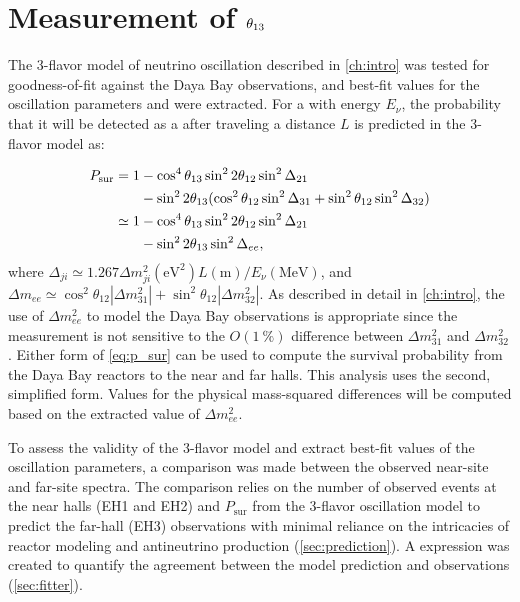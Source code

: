 \chapter{Measurement of \texorpdfstring{$\theta_{13}$}{theta13}}
\label{ch:analysis}

The 3-flavor model of neutrino oscillation described in \cref{ch:intro}
was tested for goodness-of-fit against the Daya Bay observations,
and best-fit values for the oscillation parameters \thetaot{} and \dmee{}
were extracted.
For a \nuebar{} with energy $E_\nu$,
the probability that it will be detected as a \nuebar{}
after traveling a distance $L$ is predicted in the 3-flavor model as:

\begin{align}\label{eq:p_sur}
    \begin{split}
        P_\text{sur} = 1 &- \cos^4\theta_{13}\sin^22\theta_{12}\sin^2\Delta_{21} \\
                         &- \sin^22\theta_{13}(\cos^2\theta_{12}\sin^2\Delta_{31}
                     + \sin^2\theta_{12}\sin^2\Delta_{32}) \\
        \simeq 1 &- \cos^4\theta_{13}\sin^22\theta_{12}\sin^2\Delta_{21} \\
                 &- \sin^22\theta_{13}\sin^2\Delta_{ee},
\end{split}
\end{align}
where
$\Delta_{ji} \simeq 1.267 \Delta m^2_{ji} (\si{\eV}^2) L(\si{\m})/E_\nu (\si{\MeV})$,
and
$\Delta m_{ee} \simeq \cos^2\theta_{12}\left|\Delta m^2_{31}\right| +
\sin^2\theta_{12}\left|\Delta m^2_{32}\right|$.
As described in detail in \cref{ch:intro},
the use of $\Delta m^2_{ee}$ to model the Daya Bay observations
is appropriate since the measurement is not sensitive
to the $O(\SI{1}{\percent})$ difference between $\Delta m^2_{31}$ and $\Delta m^2_{32}$.
Either form of \cref{eq:p_sur} can be used to compute the \nuebar{} survival probability
from the Daya Bay reactors to the near and far halls.
This analysis uses the second, simplified form.
Values for the physical mass-squared differences will be computed
based on the extracted value of $\Delta m^2_{ee}$.

To assess the validity of the 3-flavor model and extract best-fit values
of the oscillation parameters,
a comparison was made between the observed near-site and far-site \nuebar{} spectra.
The comparison relies on the number of observed events at the near halls (EH1 and EH2)
and $P_\text{sur}$ from the 3-flavor oscillation model
to predict the far-hall (EH3) observations
with minimal reliance on the intricacies of reactor modeling
and antineutrino production (\cref{sec:prediction}).
A \chisquare{} expression was created to quantify the agreement
between the model prediction and observations (\cref{sec:fitter}).

